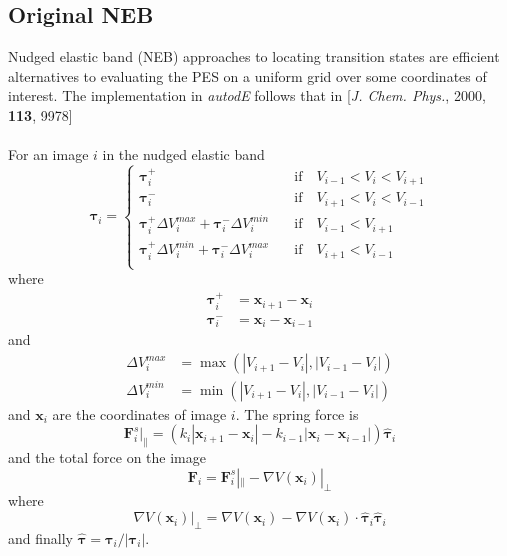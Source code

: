 \documentclass[10pt]{article}
\begin{document}
\subsection{Original NEB}

Nudged elastic band (NEB) approaches to locating transition states are efficient alternatives to evaluating the PES on a uniform grid over some coordinates of interest. The implementation in \emph{autodE} follows that in [\emph{J. Chem. Phys.}, 2000, {\bfseries{113}}, 9978]
\\\\
For an image $i$ in the nudged elastic band
\begin{equation}
\boldsymbol{\tau}_i = 
\begin{cases}
\boldsymbol{\tau}_i^+ &\quad\text{if}\quad V_{i-1} < V_i < V_{i+1} \\
\boldsymbol{\tau}_i^- &\quad\text{if}\quad V_{i+1} < V_i < V_{i-1} \\
\boldsymbol{\tau}_i^+\Delta V_i^{max} + \boldsymbol{\tau}_i^-\Delta V_i^{min} &\quad\text{if}\quad V_{i-1} <  V_{i+1} \\
\boldsymbol{\tau}_i^+\Delta V_i^{min} + \boldsymbol{\tau}_i^-\Delta V_i^{max} &\quad\text{if}\quad V_{i+1} < V_{i-1} \\
\end{cases}
\end{equation}
where
\begin{equation}
\begin{aligned}
\boldsymbol{\tau}_i^+ &= \boldsymbol{x}_{i+1} - \boldsymbol{x}_i \\
\boldsymbol{\tau}_i^- &= \boldsymbol{x}_{i} - \boldsymbol{x}_{i-1}
\end{aligned}
\end{equation}
and
\begin{equation}
\begin{aligned}
\Delta V_i^{max} &= \max(|V_{i+1} - V_i|, |V_{i-1} - V_i|) \\
\Delta V_i^{min} &= \min(|V_{i+1} - V_i|, |V_{i-1} - V_i|)
\end{aligned}
\end{equation}
and $\boldsymbol{x}_i$ are the coordinates of image $i$. The spring force is
\begin{equation}
\boldsymbol{F}^s_i|_{\parallel} = (k_i|\boldsymbol{x}_{i+1} - \boldsymbol{x}_i| - k_{i-1}|\boldsymbol{x}_i - \boldsymbol{x}_{i-1}|) \hat{\boldsymbol{\tau}}_i
\end{equation}
and the total force on the image
\begin{equation}
\boldsymbol{F}_i = \boldsymbol{F}^s_i|_{\parallel} - \nabla V(\boldsymbol{x}_i)|_\perp
\end{equation}
where
\begin{equation}
\nabla V(\boldsymbol{x}_i)|_\perp = \nabla V(\boldsymbol{x}_i) - \nabla V(\boldsymbol{x}_i)\cdot \hat{\boldsymbol{\tau}}_i\hat{\boldsymbol{\tau}}_i
\end{equation}
and finally $\hat{\boldsymbol{\tau}} = \boldsymbol{\tau}_i/|\boldsymbol{\tau}_i|$.
\\\\
\end{document}
